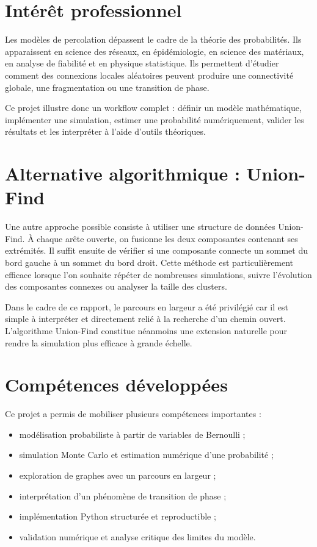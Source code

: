 \documentclass[11pt,a4paper]{report}
\begin{document}
\section{Intérêt professionnel}

Les modèles de percolation dépassent le cadre de la théorie des probabilités. Ils apparaissent en science des réseaux, en épidémiologie, en science des matériaux, en analyse de fiabilité et en physique statistique. Ils permettent d'étudier comment des connexions locales aléatoires peuvent produire une connectivité globale, une fragmentation ou une transition de phase.

Ce projet illustre donc un workflow complet : définir un modèle mathématique, implémenter une simulation, estimer une probabilité numériquement, valider les résultats et les interpréter à l'aide d'outils théoriques.

\section{Alternative algorithmique : Union-Find}

Une autre approche possible consiste à utiliser une structure de données Union-Find. À chaque arête ouverte, on fusionne les deux composantes contenant ses extrémités. Il suffit ensuite de vérifier si une composante connecte un sommet du bord gauche à un sommet du bord droit. Cette méthode est particulièrement efficace lorsque l'on souhaite répéter de nombreuses simulations, suivre l'évolution des composantes connexes ou analyser la taille des clusters.

Dans le cadre de ce rapport, le parcours en largeur a été privilégié car il est simple à interpréter et directement relié à la recherche d'un chemin ouvert. L'algorithme Union-Find constitue néanmoins une extension naturelle pour rendre la simulation plus efficace à grande échelle.

\section{Compétences développées}

Ce projet a permis de mobiliser plusieurs compétences importantes :
\begin{itemize}
    \item modélisation probabiliste à partir de variables de Bernoulli ;
    \item simulation Monte Carlo et estimation numérique d'une probabilité ;
    \item exploration de graphes avec un parcours en largeur ;
    \item interprétation d'un phénomène de transition de phase ;
    \item implémentation Python structurée et reproductible ;
    \item validation numérique et analyse critique des limites du modèle.
\end{itemize}
\end{document}
